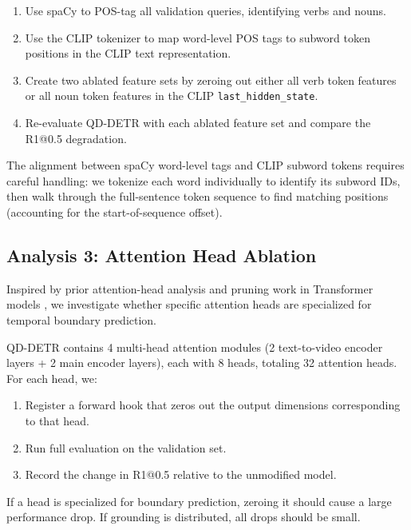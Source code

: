\documentclass[10pt,twocolumn]{article}
\begin{document}
\begin{enumerate}[nosep,leftmargin=*]
  \item Use spaCy \citep{honnibal2020spacy} to POS-tag all validation queries, identifying verbs and nouns.
  \item Use the CLIP tokenizer to map word-level POS tags to subword token positions in the CLIP text representation.
  \item Create two ablated feature sets by zeroing out either all verb token features or all noun token features in the CLIP \texttt{last\_hidden\_state}.
  \item Re-evaluate QD-DETR with each ablated feature set and compare the R1@0.5 degradation.
\end{enumerate}

The alignment between spaCy word-level tags and CLIP subword tokens requires careful handling: we tokenize each word individually to identify its subword IDs, then walk through the full-sentence token sequence to find matching positions (accounting for the start-of-sequence offset).

\subsection{Analysis 3: Attention Head Ablation}
\label{sec:method_head}

Inspired by prior attention-head analysis and pruning work in Transformer models \citep{voita2019analyzing,michel2019sixteen}, we investigate whether specific attention heads are specialized for temporal boundary prediction.

QD-DETR contains 4 multi-head attention modules (2 text-to-video encoder layers + 2 main encoder layers), each with 8 heads, totaling 32 attention heads. For each head, we:

\begin{enumerate}[nosep,leftmargin=*]
  \item Register a forward hook that zeros out the output dimensions corresponding to that head.
  \item Run full evaluation on the validation set.
  \item Record the change in R1@0.5 relative to the unmodified model.
\end{enumerate}

If a head is specialized for boundary prediction, zeroing it should cause a large performance drop. If grounding is distributed, all drops should be small.

\end{document}

